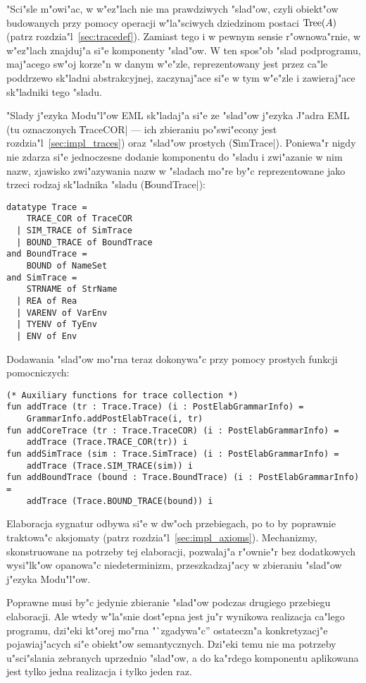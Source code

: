"Sci"sle m"owi"ac, w w"ez"lach nie ma prawdziwych "slad"ow,
czyli obiekt"ow budowanych przy pomocy operacji w"la"sciwych dziedzinom postaci 
$\mbox{Tree}(A)$ (patrz rozdzia"l~\ref{sec:tracedef}).
Zamiast tego i w pewnym sensie r"ownowa"rnie,
w w"ez"lach znajduj"a si"e komponenty "slad"ow.
W ten spos"ob "slad podprogramu, maj"acego sw"oj korze"n w danym w"e"zle,
reprezentowany jest przez ca"le poddrzewo sk"ladni abstrakcyjnej, 
zaczynaj"ace si"e w tym w"e"zle i zawieraj"ace sk"ladniki tego "sladu.

"Slady j"ezyka Modu"l"ow EML sk"ladaj"a si"e ze "slad"ow j"ezyka J"adra EML
(tu oznaczonych \|TraceCOR| --- ich zbieraniu po"swi"econy jest rozdzia"l~\ref{sec:impl_traces})
oraz "slad"ow prostych (\|SimTrace|). 
Poniewa"r nigdy nie zdarza si"e jednoczesne dodanie komponentu do "sladu i zwi"azanie w nim nazw,
zjawisko zwi"azywania nazw w "sladach mo"re by"c reprezentowane 
jako trzeci rodzaj sk"ladnika "sladu (\|BoundTrace|):
{\small
\begin{verbatim}
datatype Trace = 
    TRACE_COR of TraceCOR
  | SIM_TRACE of SimTrace
  | BOUND_TRACE of BoundTrace 
and BoundTrace = 
    BOUND of NameSet
and SimTrace = 
    STRNAME of StrName
  | REA of Rea
  | VARENV of VarEnv
  | TYENV of TyEnv
  | ENV of Env
\end{verbatim}
}
Dodawania "slad"ow mo"rna teraz dokonywa"c przy pomocy prostych funkcji pomocniczych:
{\small
\begin{verbatim}
(* Auxiliary functions for trace collection *)               
fun addTrace (tr : Trace.Trace) (i : PostElabGrammarInfo) =
    GrammarInfo.addPostElabTrace(i, tr)
fun addCoreTrace (tr : Trace.TraceCOR) (i : PostElabGrammarInfo) =
    addTrace (Trace.TRACE_COR(tr)) i
fun addSimTrace (sim : Trace.SimTrace) (i : PostElabGrammarInfo) =
    addTrace (Trace.SIM_TRACE(sim)) i
fun addBoundTrace (bound : Trace.BoundTrace) (i : PostElabGrammarInfo) =
    addTrace (Trace.BOUND_TRACE(bound)) i
\end{verbatim}
}

Elaboracja sygnatur odbywa si"e w dw"och przebiegach,
po to by poprawnie traktowa"c aksjomaty (patrz rozdzia"l~\ref{sec:impl_axioms}). 
Mechanizmy, skonstruowane na potrzeby tej elaboracji,
pozwalaj"a r"ownie"r bez dodatkowych wysi"lk"ow opanowa"c niedeterminizm, 
przeszkadzaj"acy w zbieraniu "slad"ow j"ezyka Modu"l"ow.

Poprawne musi by"c jedynie zbieranie "slad"ow podczas drugiego przebiegu elaboracji.
Ale wtedy w"la"snie dost"epna jest ju"r wynikowa realizacja ca"lego programu,
dzi"eki kt"orej mo"rna "`zgadywa"c'' ostateczn"a konkretyzacj"e pojawiaj"acych si"e obiekt"ow semantycznych.
Dzi"eki temu nie ma potrzeby u\-"sci\-"sla\-nia zebranych uprzednio "slad"ow,
a do ka"rdego komponentu aplikowana jest tylko jedna realizacja i tylko jeden raz.

